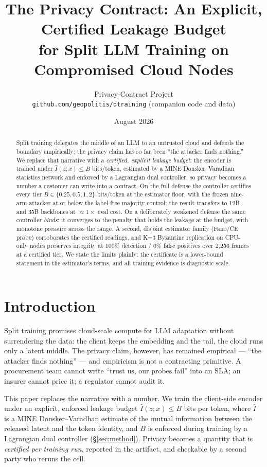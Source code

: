 \documentclass[10pt]{article}
\title{The Privacy Contract: An Explicit, Certified Leakage Budget\\
for Split LLM Training on Compromised Cloud Nodes}
\author{Privacy-Contract Project\\
\texttt{github.com/geopolitis/dtraining} (companion code and data)}
\date{August 2026}
\newcommand{\Ihat}{\hat{I}}
\begin{document}
\maketitle

\begin{abstract}
Split training delegates the middle of an LLM to an untrusted cloud and
defends the boundary empirically; the privacy claim has so far been
``the attacker finds nothing.''  We replace that narrative with a
\emph{certified, explicit leakage budget}: the encoder is trained under
$\Ihat(z;x) \le B$ bits/token, estimated by a MINE Donsker--Varadhan
statistics network and enforced by a Lagrangian dual controller, so
privacy becomes a number a customer can write into a contract.  On the
full defense the controller certifies every tier $B \in
\{0.25, 0.5, 1, 2\}$ bits/token at the estimator floor, with the frozen
nine-arm attacker at or below the label-free majority control; the
result transfers to 12B and 35B backbones at $\approx 1\times$ eval
cost.  On a deliberately weakened defense the same controller
\emph{binds}: it converges to the penalty that holds the leakage at the
budget, with monotone pressure across the range.  A second,
disjoint estimator family (Fano/CE probe) corroborates the certified
readings, and K=3 Byzantine replication on CPU-only nodes preserves
integrity at 100\% detection / 0\% false positives over 2{,}256 frames
at a certified tier.  We state the limits plainly: the certificate is a
lower-bound statement in the estimator's terms, and all training
evidence is diagnostic scale.
\end{abstract}

\clearpage
\twocolumn

\section{Introduction}

Split training promises cloud-scale compute for LLM adaptation without
surrendering the data: the client keeps the embedding and the tail, the
cloud runs only a latent middle.  The privacy claim, however, has
remained empirical — ``the attacker finds nothing'' — and empiricism is
not a contracting primitive.  A procurement team cannot write ``trust us,
our probes fail'' into an SLA; an insurer cannot price it; a regulator
cannot audit it.

This paper replaces the narrative with a number.  We train the
client-side encoder under an explicit, enforced leakage budget
$\Ihat(z;x) \le B$ bits per token, where $\Ihat$ is a MINE
Donsker--Varadhan estimate of the mutual information between the released
latent and the token identity, and $B$ is enforced during training by a
Lagrangian dual controller (\S\ref{sec:method}).  Privacy becomes a
quantity that is \emph{certified per training run}, reported in the
artifact, and checkable by a second party who reruns the cell.
\end{document}
